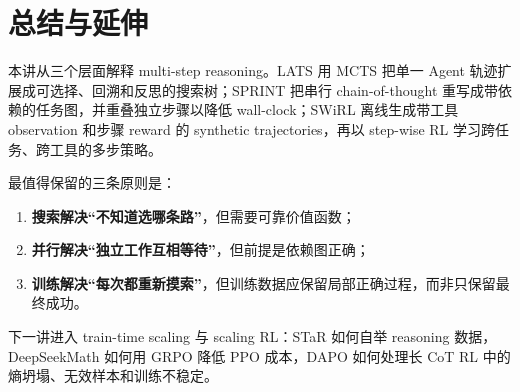 \section{总结与延伸}

本讲从三个层面解释 multi-step reasoning。LATS 用 MCTS 把单一 Agent 轨迹扩展成可选择、回溯和反思的搜索树；SPRINT 把串行 chain-of-thought 重写成带依赖的任务图，并重叠独立步骤以降低 wall-clock；SWiRL 离线生成带工具 observation 和步骤 reward 的 synthetic trajectories，再以 step-wise RL 学习跨任务、跨工具的多步策略。

最值得保留的三条原则是：

\begin{enumerate}
    \item \textbf{搜索解决“不知道选哪条路”}，但需要可靠价值函数；
    \item \textbf{并行解决“独立工作互相等待”}，但前提是依赖图正确；
    \item \textbf{训练解决“每次都重新摸索”}，但训练数据应保留局部正确过程，而非只保留最终成功。
\end{enumerate}

下一讲进入 train-time scaling 与 scaling RL：STaR 如何自举 reasoning 数据，DeepSeekMath 如何用 GRPO 降低 PPO 成本，DAPO 如何处理长 CoT RL 中的熵坍塌、无效样本和训练不稳定。


